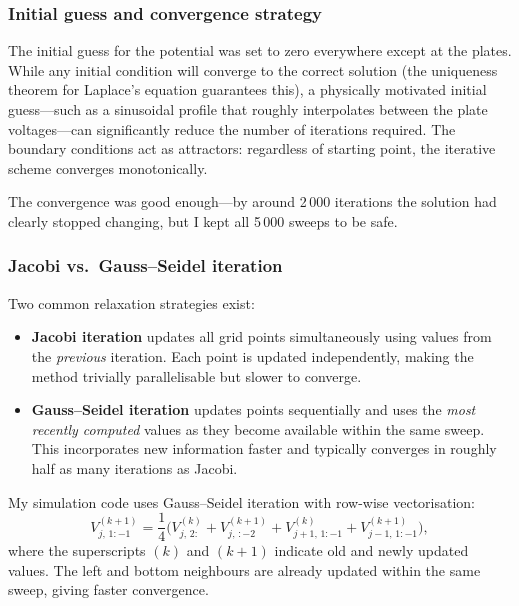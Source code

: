 \documentclass[11pt,a4paper]{article}
\begin{document}
\subsubsection{Initial guess and convergence strategy}

The initial guess for the potential was set to zero everywhere except at the plates. While any initial condition will converge to the correct solution (the uniqueness theorem for Laplace's equation guarantees this), a physically motivated initial guess---such as a sinusoidal profile that roughly interpolates between the plate voltages---can significantly reduce the number of iterations required. The boundary conditions act as attractors: regardless of starting point, the iterative scheme converges monotonically.

The convergence was good enough---by around 2\,000 iterations the solution had clearly stopped changing, but I kept all 5\,000 sweeps to be safe.

\subsubsection{Jacobi vs.\ Gauss--Seidel iteration}

Two common relaxation strategies exist:
\begin{itemize}[leftmargin=2em]
\item \textbf{Jacobi iteration} updates all grid points simultaneously using values from the \emph{previous} iteration. Each point is updated independently, making the method trivially parallelisable but slower to converge.
\item \textbf{Gauss--Seidel iteration} updates points sequentially and uses the \emph{most recently computed} values as they become available within the same sweep. This incorporates new information faster and typically converges in roughly half as many iterations as Jacobi.
\end{itemize}

My simulation code uses Gauss--Seidel iteration with row-wise vectorisation:
\begin{equation}
V_{j,\,1:-1}^{(k+1)} = \frac{1}{4}\bigl(V_{j,\,2:}^{(k)} + V_{j,\,:-2}^{(k+1)} + V_{j+1,\,1:-1}^{(k)} + V_{j-1,\,1:-1}^{(k+1)}\bigr),
\end{equation}
where the superscripts $(k)$ and $(k+1)$ indicate old and newly updated values. The left and bottom neighbours are already updated within the same sweep, giving faster convergence.
\end{document}
